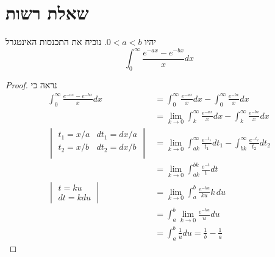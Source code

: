 \section{שאלת רשות}
יהיו $0 < a < b$. נוכיח את התכנסות האינטגרל
\[
	\int_0^\infty \frac{e^{-ax} - e^{-bx}}{x}dx \tag{1}
\]
\begin{proof}
	נראה כי
	\begin{align*}
		\int_0^\infty \frac{e^{-ax} - e^{-bx}}{x}dx
		& = \int_0^\infty \frac{e^{-ax}}{x}dx - \int_0^\infty \frac{e^{-bx}}{x}dx \\
		& = \lim_{k \to 0} \int_k^\infty \frac{e^{-ax}}{x}dx - \int_k^\infty \frac{e^{-bx}}{x}dx \\
		\begin{vmatrix}
			t_1 = x/a & dt_1 = dx/a \\
			t_2 = x/b & dt_2 = dx/b \\
		\end{vmatrix}
		& = \lim_{k \to 0} \int_{ak}^\infty \frac{e^{-t_1}}{t_1}dt_1 - \int_{bk}^\infty \frac{e^{-t_2}}{t_2}dt_2 \\
		& = \lim_{k \to 0} \int_{ak}^{bk} \frac{e^{-t}}{t}dt \\
		\begin{vmatrix}
			t = ku \\
			dt = k du
		\end{vmatrix}
		& = \lim_{k \to 0} \int_{a}^{b} \frac{e^{-k u}}{k u}k \, du \\
		& = \int_{a}^{b} \lim_{k \to 0} \frac{e^{-k u}}{u} du \\
		& = \int_{a}^{b} \frac{1}{u} du = \frac{1}{b} - \frac{1}{a}
	\end{align*}
\end{proof}
